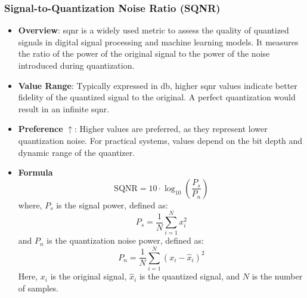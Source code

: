 \documentclass{ioereport}
\begin{document}
        \subsubsection{Signal-to-Quantization Noise Ratio (SQNR)}
        \label{subsubsec:SQNR}
        \begin{itemize}
            \item \textbf{Overview}: \gls{sqnr} is a widely used metric to assess the quality of quantized signals in digital signal processing and machine learning models. It measures the ratio of the power of the original signal to the power of the noise introduced during quantization.
            \item \textbf{Value Range}: Typically expressed in \gls{db}, higher \gls{sqnr} values indicate better fidelity of the quantized signal to the original. A perfect quantization would result in an infinite \gls{sqnr}.
            \item \textbf{Preference} $\uparrow$: Higher values are preferred, as they represent lower quantization noise. For practical systems, values depend on the bit depth and dynamic range of the quantizer.
            \item \textbf{Formula}
            \begin{equation}\label{eqn:SQNR}
                \text{SQNR} = 10 \cdot \log_{10}\left(\frac{P_s}{P_n}\right)
            \end{equation}
            where, \(P_s\) is the signal power, defined as:
            \begin{equation}
                P_s = \frac{1}{N} \sum_{i=1}^N x_i^2
            \end{equation}
            and \(P_n\) is the quantization noise power, defined as:
            \begin{equation}
                P_n = \frac{1}{N} \sum_{i=1}^N (x_i - \hat{x}_i)^2
            \end{equation}
            Here, \(x_i\) is the original signal, \(\hat{x}_i\) is the quantized signal, and \(N\) is the number of samples.
        \end{itemize}
               
           
\end{document}
